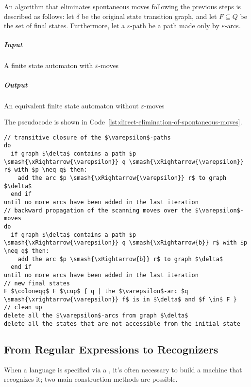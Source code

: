 \documentclass[english]{article}
\begin{document}
\bigskip
An algorithm that eliminates spontaneous moves following the previous steps is described as follows:
let \(\delta\) be the original state transition graph, and let \(F \subseteq Q\) be the set of final states.
Furthermore, let a \(\varepsilon\)-path be a path made only by \(\varepsilon\)-arcs.

\subparagraph*{Input}
A finite state automaton with \(\varepsilon\)-moves

\subparagraph*{Output}
An equivalent finite state automaton without \(\varepsilon\)-moves

\bigskip
The pseudocode is shown in Code~\ref{lst:direct-elimination-of-spontaneous-moves}.

\begin{lstlisting}[caption={Direct elimination of spontaneous moves}, label={lst:direct-elimination-of-spontaneous-moves}]
// transitive closure of the $\varepsilon$-paths
do
  if graph $\delta$ contains a path $p \smash{\xRightarrow{\varepsilon}} q \smash{\xRightarrow{\varepsilon}} r$ with $p \neq q$ then:
    add the arc $p \smash{\xRightarrow{\varepsilon}} r$ to graph $\delta$
  end if
until no more arcs have been added in the last iteration
// backward propagation of the scanning moves over the $\varepsilon$-moves
do
  if graph $\delta$ contains a path $p \smash{\xRightarrow{\varepsilon}} q \smash{\xRightarrow{b}} r$ with $p \neq q$ then:
    add the arc $p \smash{\xRightarrow{b}} r$ to graph $\delta$
  end if
until no more arcs have been added in the last iteration
// new final states
F $\coloneqq$ F $\cup$ { q | the $\varepsilon$-arc $q \smash{\xrightarrow{\varepsilon}} f$ is in $\delta$ and $f \in$ F }
// clean up
delete all the $\varepsilon$-arcs from graph $\delta$
delete all the states that are not accessible from the initial state
\end{lstlisting}

\subsection{From Regular Expressions to Recognizers}

When a language is specified via a \re, it's often necessary to build a machine that recognizes it;
two main construction methods are possible.
\end{document}
